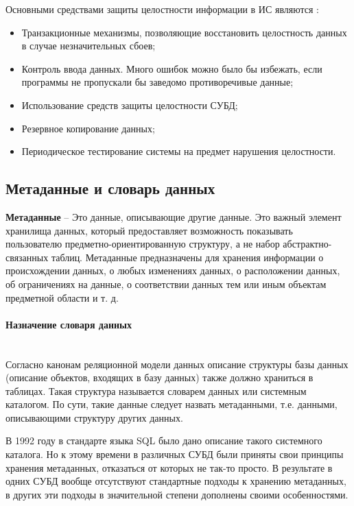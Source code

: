 Основными средствами защиты целостности информации в ИС являются \autocite{Pirogov2009}:
\begin{itemize}
    \item Транзакционные механизмы, позволяющие восстановить целостность данных в случае незначительных сбоев;
    \item Контроль ввода данных. Много ошибок можно было бы избежать, если программы не пропускали бы заведомо противоречивые данные;
    \item Использование средств защиты целостности СУБД;
    \item Резервное копирование данных;
    \item Периодическое тестирование системы на предмет нарушения целостности.
\end{itemize}

\subsection{Метаданные и словарь данных}

\begin{grayquote}
	\textbf{Метаданные} -- Это данные, описывающие другие данные. Это важный элемент хранилища данных, который предоставляет возможность показывать пользователю предметно-ориентированную структуру, а не набор абстрактно-связанных таблиц. Метаданные предназначены для хранения информации о происхождении данных, о любых изменениях данных, о расположении данных, об ограничениях на данные, о соответствии данных тем или иным объектам предметной области и т. д. \autocite{Pirogov2009}
\end{grayquote}

\paragraph{Назначение словаря данных} ~\\

Согласно канонам реляционной модели данных описание структуры базы данных (описание объектов, входящих в базу данных) также должно храниться в таблицах. Такая структура называется словарем данных или системным каталогом. По сути, такие данные следует назвать метаданными, т.е. данными, описывающими структуру других данных.


В 1992 году в стандарте языка SQL было дано описание такого системного каталога. Но к этому времени в различных СУБД были приняты свои принципы хранения метаданных, отказаться от которых не так-то просто. В результате в одних СУБД вообще отсутствуют стандартные подходы к хранению метаданных, в других эти подходы в значительной степени дополнены своими особенностями. \autocite{Pirogov2009}


